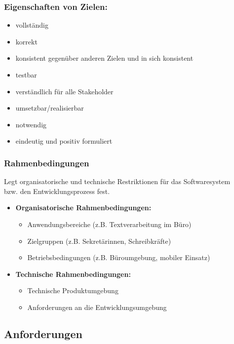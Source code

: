 \documentclass[11pt, a4paper]{article}
\begin{document}
\subsubsection*{Eigenschaften von Zielen:}

\begin{itemize}
    \item vollständig
    \item korrekt
    \item konsistent gegenüber anderen Zielen und in sich konsistent
    \item testbar
    \item verständlich für alle Stakeholder
    \item umsetzbar/realisierbar
    \item notwendig
    \item eindeutig und positiv formuliert
\end{itemize}

\subsubsection{Rahmenbedingungen}

Legt organisatorische und technische Restriktionen für das Softwaresystem \\bzw. den Entwicklungsprozess fest.

\begin{itemize}
    \item \textbf{Organisatorische Rahmenbedingungen:}
    \begin{itemize}
        \item Anwendungsbereiche (z.B. Textverarbeitung im Büro)
        \item Zielgruppen (z.B. Sekretärinnen, Schreibkräfte)
        \item Betriebsbedingungen (z.B. Büroumgebung, mobiler Einsatz)
    \end{itemize}
    \item \textbf{Technische Rahmenbedingungen:}
    \begin{itemize}
        \item Technische Produktumgebung
        \item Anforderungen an die Entwicklungsumgebung
    \end{itemize}
\end{itemize}

\newpage


\subsection{Anforderungen}
\end{document}
